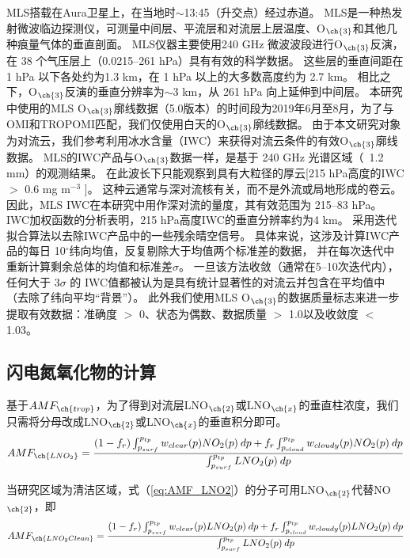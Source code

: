MLS搭载在Aura卫星上，在当地时$\sim$13:45（升交点）经过赤道。
MLS是一种热发射微波临边探测仪，可测量中间层、平流层和对流层上层温度、O$_{\ch{3}}$和其他几种痕量气体的垂直剖面。
MLS仪器主要使用240 GHz 微波波段进行O$_{\ch{3}}$反演，在 38 个气压层上（0.0215--261 hPa）具有有效的科学数据。
这些层的垂直间距在1 hPa 以下各处约为1.3 km，在 1 hPa 以上的大多数高度约为 2.7 km。
相比之下，O$_{\ch{3}}$反演的垂直分辨率为$\sim$3 km，从 261 hPa 向上延伸到中间层。
本研究中使用的MLS O$_{\ch{3}}$廓线数据（5.0版本）的时间段为2019年6月至8月，为了与OMI和TROPOMI匹配，我们仅使用白天的O$_{\ch{3}}$廓线数据。
由于本文研究对象为对流云，我们参考\citet{Livesey.2013}利用冰水含量（IWC）来获得对流云条件的有效O$_{\ch{3}}$廓线数据。
MLS的IWC产品与O$_{\ch{3}}$数据一样，是基于 240 GHz 光谱区域（~1.2 mm）的观测结果。
在此波长下只能观察到具有大粒径的厚云[215 hPa高度的IWC $>$ 0.6 mg m$^{-3}$ \citep{Wu.2008}]。 这种云通常与深对流核有关，而不是外流或局地形成的卷云。
因此，MLS IWC在本研究中用作深对流的量度，其有效范围为 215--83 hPa。
IWC加权函数的分析表明，215 hPa高度IWC的垂直分辨率约为4 km\citep{Wu.2008}。
\citet{Livesey.2013}采用迭代拟合算法以去除IWC产品中的一些残余晴空信号。
具体来说，这涉及计算IWC产品的每日 10$^{\circ}$纬向均值，反复剔除大于均值两个标准差的数据，
并在每次迭代中重新计算剩余总体的均值和标准差$\sigma$。
一旦该方法收敛（通常在5--10次迭代内），任何大于 3$\sigma$ 的 IWC值都被认为是具有统计显著性的对流云并包含在平均值中（去除了纬向平均“背景”）。
此外我们使用MLS O$_{\ch{3}}$的数据质量标志来进一步提取有效数据：准确度 $>$ 0、状态为偶数、数据质量 $>$ 1.0以及收敛度 $<$ 1.03。


\subsection{闪电氮氧化物的计算} \label{sec:amf_definition}

基于$AMF_{\ch{trop}}$，为了得到对流层LNO$_{\ch{2}}$或LNO$_{\ch{x}}$的垂直柱浓度，我们只需将分母改成LNO$_{\ch{2}}$或LNO$_{\ch{x}}$的垂直积分即可。
\begin{equation} \label{eq:AMF_LNO2}
AMF_{\ch{LNO_2}} = \frac{(1-f_r) \int_{p_{surf}}^{p_{tp}} w_{clear}(p) NO_2(p) \: dp + f_r \int_{p_{cloud}}^{p_{tp}} w_{cloudy}(p) NO_2(p) \: dp}{\int_{p_{surf}}^{p_{tp}} LNO_2(p) \: dp}
\end{equation}

当研究区域为清洁区域，式（\ref{eq:AMF_LNO2}）的分子可用LNO$_{\ch{2}}$代替NO$_{\ch{2}}$，即
\begin{equation} \label{eq:AMF_LNO2clean}
AMF_{\ch{LNO_2Clean}} = \frac{(1-f_r) \int_{p_{surf}}^{p_{tp}} w_{clear}(p) LNO_2(p) \: dp + f_r \int_{p_{cloud}}^{p_{tp}} w_{cloudy}(p) LNO_2(p) \: dp}{\int_{p_{surf}}^{p_{tp}} LNO_2(p) \: dp}
\end{equation}

